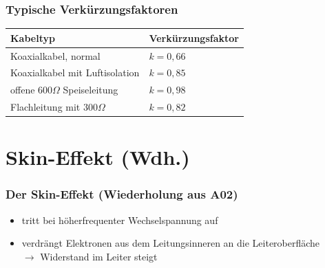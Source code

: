 \begin{frame}
  \frametitle{Typische Verkürzungsfaktoren}
  \begin{center}
    \begin{tabular}{l|l}
      \textbf{Kabeltyp} & \textbf{Verkürzungsfaktor} \\ \hline
      Koaxialkabel, normal & $k = 0,66$ \\
      Koaxialkabel mit Luftisolation & $k = 0,85$ \\
      offene $600 \Omega$ Speiseleitung & $k = 0,98$ \\
      Flachleitung mit $300 \Omega$ & $k = 0,82$ \\
    \end{tabular}
  \end{center}
\end{frame}

\section[Skin-Effekt]{Skin-Effekt (Wdh.)}
\begin{frame}
  \frametitle{Der Skin-Effekt (Wiederholung aus A02)}
  \begin{itemize}
    \item tritt bei höherfrequenter Wechselspannung auf
    \item verdrängt Elektronen aus dem Leitungsinneren an die Leiteroberfläche \\
      $\rightarrow$ Widerstand im Leiter steigt
  \end{itemize}
\end{frame}

